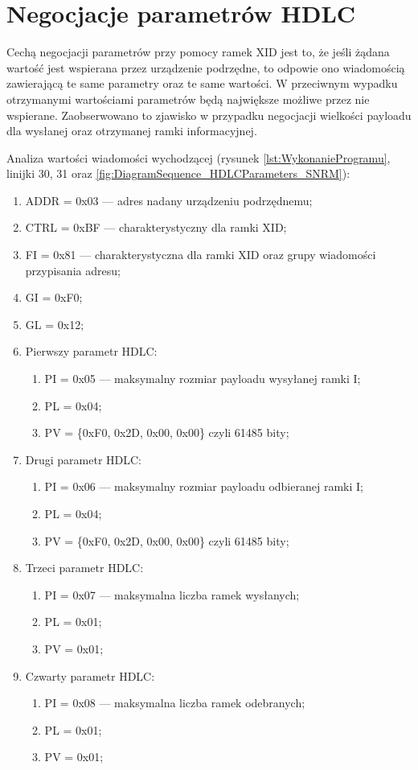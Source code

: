 \section{Negocjacje parametrów HDLC}
Cechą negocjacji parametrów przy pomocy ramek XID jest to, że jeśli żądana wartość jest wspierana przez
urządzenie podrzędne, to odpowie ono wiadomością zawierającą te same parametry oraz te same wartości. 
W przeciwnym wypadku otrzymanymi wartościami parametrów będą największe możliwe przez nie wspierane.
Zaobserwowano to zjawisko w przypadku negocjacji wielkości payloadu dla wysłanej oraz otrzymanej ramki informacyjnej.

Analiza wartości wiadomości wychodzącej 
(rysunek \ref{lst:WykonanieProgramu}, linijki {30, 31} oraz \ref{fig:DiagramSequence_HDLCParameters_SNRM}):
\begin{enumerate}
    \item ADDR = 0x03 --- adres nadany urządzeniu podrzędnemu;
    \item CTRL = 0xBF --- charakterystyczny dla ramki XID;
    \item FI = 0x81 --- charakterystyczna dla ramki XID oraz grupy wiadomości przypisania adresu;
    \item GI = 0xF0;
    \item GL = 0x12;
    \item Pierwszy parametr HDLC:
    \begin{enumerate}
        \item PI = 0x05 --- maksymalny rozmiar payloadu wysyłanej ramki I;
        \item PL = 0x04;
        \item PV = \{0xF0, 0x2D, 0x00, 0x00\} czyli 61485 bity;
    \end{enumerate}
    \item Drugi parametr HDLC:
    \begin{enumerate}
        \item PI = 0x06 --- maksymalny rozmiar payloadu odbieranej ramki I;
        \item PL = 0x04;
        \item PV = \{0xF0, 0x2D, 0x00, 0x00\} czyli 61485 bity;
    \end{enumerate}
    \item Trzeci parametr HDLC:
    \begin{enumerate}
        \item PI = 0x07 --- maksymalna liczba ramek wysłanych;
        \item PL = 0x01;
        \item PV = 0x01;
    \end{enumerate}
    \item Czwarty parametr HDLC:
    \begin{enumerate}
        \item PI = 0x08 --- maksymalna liczba ramek odebranych;
        \item PL = 0x01;
        \item PV = 0x01;
    \end{enumerate}
\end{enumerate}

